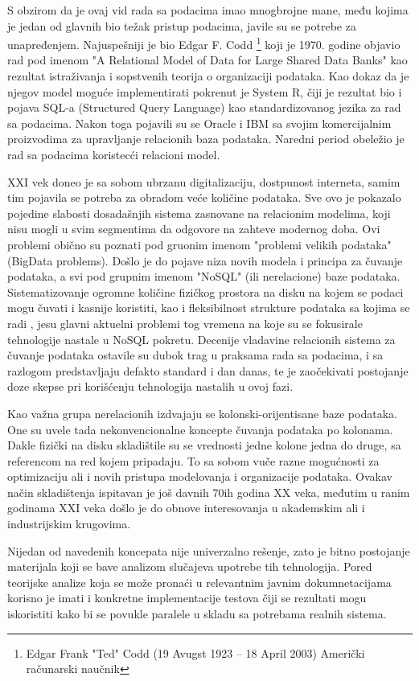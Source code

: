\documentclass[12pt,oneside]{memoir}
\begin{document}
S obzirom da je ovaj vid rada sa podacima imao mnogbrojne mane, među kojima je jedan od glavnih bio težak pristup podacima, javile su se potrebe za unapređenjem. Najuspešniji je bio Edgar F. Codd \footnote{Edgar Frank "Ted" Codd (19 Avugst 1923 – 18 April 2003) Američki računarski naučnik }  koji je 1970. godine objavio rad pod imenom "A Relational Model of Data for Large Shared Data Banks" kao rezultat istraživanja i sopstvenih teorija o organizaciji podataka.  Kao dokaz da je njegov model moguće implementirati pokrenut je System R, čiji je rezultat bio i pojava SQL-a (Structured Query Language) kao standardizovanog jezika za rad sa podacima. Nakon toga pojavili su se Oracle i IBM sa svojim komercijalnim proizvodima za upravljanje relacionih baza podataka. Naredni period obeležio je rad sa podacima koristecći relacioni model.  

XXI vek doneo je sa sobom ubrzanu digitalizaciju, dostpunost interneta, samim tim pojavila se potreba za obradom veće količine podataka. Sve ovo je pokazalo pojedine slabosti dosadašnjih sistema zasnovane na relacionim modelima, koji nisu mogli u svim segmentima da odgovore na zahteve modernog doba. Ovi problemi obično su poznati pod gruonim imenom "problemi velikih podataka" (BigData problems). Došlo je do pojave niza novih modela i principa za čuvanje podataka, a svi pod grupnim imenom "NoSQL" (ili nerelacione) baze podataka.
Sistematizovanje ogromne količine fizičkog prostora na disku na kojem se podaci mogu čuvati i kasnije koristiti, kao i fleksibilnost strukture podataka sa kojima se radi , jesu glavni aktuelni problemi tog vremena na koje su se fokusirale tehnologije nastale u NoSQL pokretu.
Decenije vladavine  relacionih sistema za čuvanje podataka ostavile su dubok trag u praksama rada sa podacima, i sa razlogom predstavljaju defakto standard i dan danas, te je zaočekivati postojanje doze skepse pri korišćenju tehnologija nastalih u ovoj fazi. 

Kao važna grupa nerelacionih izdvajaju se kolonski-orijentisane baze podataka. One su uvele tada nekonvencionalne koncepte čuvanja podataka po kolonama. Dakle fizički na disku skladištile su se vrednosti jedne kolone jedna do druge, sa referencom na red kojem pripadaju. To sa sobom vuče razne mogućnosti za optimizaciju ali i novih pristupa modelovanja i organizacije podataka. Ovakav način skladištenja ispitavan je još davnih 70ih godina XX veka, međutim u ranim godinama XXI veka došlo je do obnove interesovanja u akademskim ali i industrijskim krugovima. 

Nijedan od navedenih koncepata nije univerzalno rešenje, zato je bitno postojanje materijala koji se bave analizom slučajeva upotrebe tih tehnologija. Pored teorijske analize koja se može pronaći u relevantnim javnim dokumnetacijama korisno je imati i konkretne implementacije testova čiji se rezultati mogu iskoristiti kako bi se povukle paralele u skladu sa potrebama realnih  sistema. 
\end{document}
